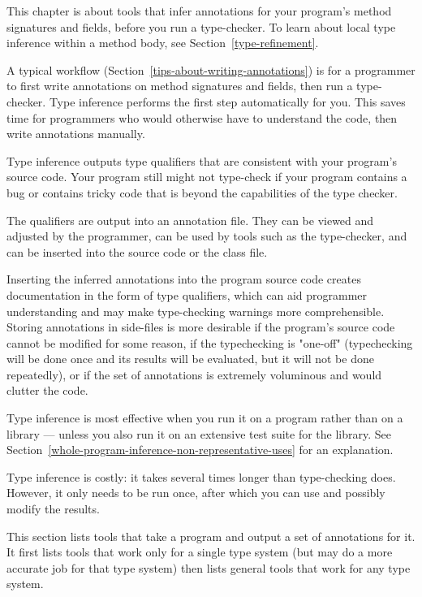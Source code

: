 \htmlhr
{}

This chapter is about tools that infer annotations for your
program's method signatures and fields, before you run a type-checker.
To learn about local type inference within a method body,
see Section~\ref{type-refinement}.

A typical workflow (Section~\ref{tips-about-writing-annotations}) is for a
programmer to first write annotations on method signatures and fields, then
run a type-checker.  Type inference performs the first step automatically
for you.  This saves time for programmers who would otherwise have to
understand the code, then write annotations manually.

Type inference outputs type qualifiers that are consistent with your
program's source code.  Your program still might not type-check if your
program contains a bug or contains tricky code that is beyond the
capabilities of the type checker.

The qualifiers are output into an annotation file.  They can be viewed and
adjusted by the programmer, can be used by tools such as the type-checker,
and can be inserted into the source code or the class file.

Inserting the inferred annotations into the program source code creates documentation in the form of type
qualifiers, which can aid programmer understanding and may make
type-checking warnings more comprehensible.
Storing annotations in side-files is more desirable if the program's source code cannot
be modified for some reason, if the typechecking is "one-off" (typechecking will
be done once and its results will be evaluated, but it will not be done
repeatedly), or if the set of annotations is extremely voluminous and would
clutter the code.


Type inference is most effective when you run it on a program rather than
on a library --- unless you also run it on an extensive test suite for the
library.  See Section~\ref{whole-program-inference-non-representative-uses}
for an explanation.


Type inference is costly:  it takes several times longer than
type-checking does.  However, it only needs to be run once, after which
you can use and possibly modify the results.



This section lists tools that take a program and output a set of
annotations for it.
It first lists tools that work only for a single type system (but may do a
more accurate job for that type system)
then lists general tools that work for any type system.

